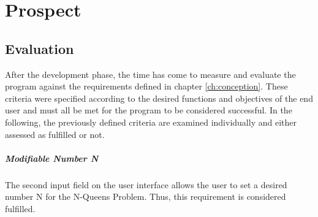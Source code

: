 
\chapter{Prospect}
\label{ch:prospect}

\section{Evaluation}
\label{sec:proEvalutation}
After the development phase, the time has come to measure and evaluate the program against the requirements defined in chapter \ref{ch:conception}. These criteria were specified according to the desired functions and objectives of the end user and must all be met for the program to be considered successful. In the following, the previously defined criteria are examined individually and either assessed as fulfilled or not.

\paragraph{Modifiable Number N}
The second input field on the user interface allows the user to set a desired number N for the N-Queens Problem. Thus, this requirement is considered fulfilled.

